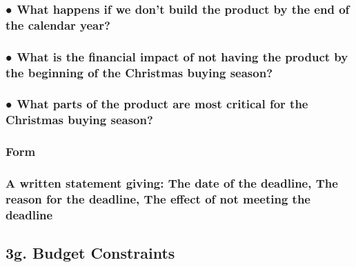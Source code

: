 \documentclass[
]{article}
\begin{document}
\hypertarget{what-happens-if-we-dont-build-the-product-by-the-end-of-the-calendar-year}{%
\subsubsection{● What happens if we don't build the product by the end
of the calendar
year?}\label{what-happens-if-we-dont-build-the-product-by-the-end-of-the-calendar-year}}

\hypertarget{what-is-the-financial-impact-of-not-having-the-product-by-the-beginning-of-the-christmas-buying-season}{%
\subsubsection{● What is the financial impact of not having the product
by the beginning of the Christmas buying
season?}\label{what-is-the-financial-impact-of-not-having-the-product-by-the-beginning-of-the-christmas-buying-season}}

\hypertarget{what-parts-of-the-product-are-most-critical-for-the-christmas-buying-season}{%
\subsubsection{● What parts of the product are most critical for the
Christmas buying
season?}\label{what-parts-of-the-product-are-most-critical-for-the-christmas-buying-season}}

\hypertarget{form-15}{%
\subsubsection{Form}\label{form-15}}

\hypertarget{a-written-statement-giving-the-date-of-the-deadline-the-reason-for-the-deadline-the-effect-of-not-meeting-the-deadline}{%
\subsubsection{A written statement giving: The date of the deadline, The
reason for the deadline, The effect of not meeting the
deadline}\label{a-written-statement-giving-the-date-of-the-deadline-the-reason-for-the-deadline-the-effect-of-not-meeting-the-deadline}}

\hypertarget{g.-budget-constraints}{%
\subsection{3g. Budget Constraints}\label{g.-budget-constraints}}
\end{document}
